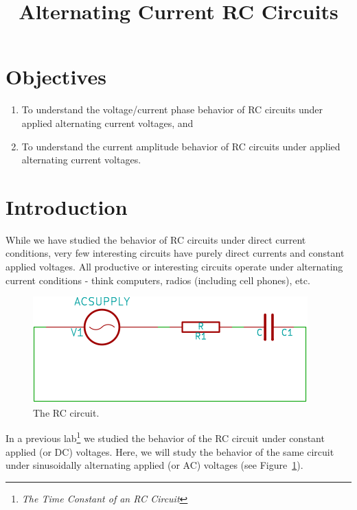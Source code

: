 \documentclass[12pt]{article}
\title{Alternating Current RC Circuits}
\author{}
\date{}
\begin{document}
\maketitle

\section{Objectives}
\label{sec:objectives}

\begin{enumerate}
\item To understand the voltage/current phase behavior of RC circuits
  under applied alternating current voltages, and
\item To understand the current amplitude behavior of RC circuits
  under applied alternating current voltages.
\end{enumerate}

\section{Introduction}
\label{sec:introduction}

While we have studied the behavior of RC circuits under direct current
conditions, very few interesting circuits have purely direct currents
and constant applied voltages.  All productive or interesting circuits
operate under alternating current conditions - think computers, radios
(including cell phones), etc.  

\begin{figure}
  \centering
  \includegraphics[width=\textwidth/2]{figures/rc-circuit}
  \caption{The RC circuit.}
  \label{fig:rccircuit}
\end{figure}
In a previous lab\footnote{\textit{The Time Constant of an RC
    Circuit}} we studied the behavior of the RC circuit under constant
applied (or DC) voltages.  Here, we will study the behavior of the
same circuit under sinusoidally alternating applied (or AC) voltages
(see Figure~\ref{fig:rccircuit}).
\end{document}
